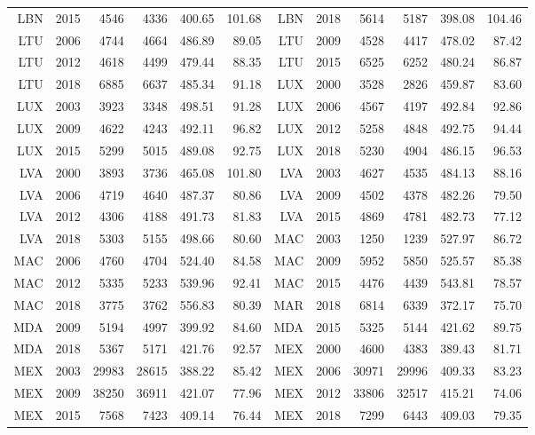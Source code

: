 {\begin{longtable}{r|r|r|r|r|r||r|r|r|r|r|r}
    LBN   & 2015  & 4546  & 4336  & 400.65 & 101.68 & LBN   & 2018  & 5614  & 5187  & 398.08 & 104.46 \\
    LTU   & 2006  & 4744  & 4664  & 486.89 & 89.05 & LTU   & 2009  & 4528  & 4417  & 478.02 & 87.42 \\
    LTU   & 2012  & 4618  & 4499  & 479.44 & 88.35 & LTU   & 2015  & 6525  & 6252  & 480.24 & 86.87 \\
    LTU   & 2018  & 6885  & 6637  & 485.34 & 91.18 & LUX   & 2000  & 3528  & 2826  & 459.87 & 83.60 \\
    LUX   & 2003  & 3923  & 3348  & 498.51 & 91.28 & LUX   & 2006  & 4567  & 4197  & 492.84 & 92.86 \\
    LUX   & 2009  & 4622  & 4243  & 492.11 & 96.82 & LUX   & 2012  & 5258  & 4848  & 492.75 & 94.44 \\
    LUX   & 2015  & 5299  & 5015  & 489.08 & 92.75 & LUX   & 2018  & 5230  & 4904  & 486.15 & 96.53 \\
    LVA   & 2000  & 3893  & 3736  & 465.08 & 101.80 & LVA   & 2003  & 4627  & 4535  & 484.13 & 88.16 \\
    LVA   & 2006  & 4719  & 4640  & 487.37 & 80.86 & LVA   & 2009  & 4502  & 4378  & 482.26 & 79.50 \\
    LVA   & 2012  & 4306  & 4188  & 491.73 & 81.83 & LVA   & 2015  & 4869  & 4781  & 482.73 & 77.12 \\
    LVA   & 2018  & 5303  & 5155  & 498.66 & 80.60 & MAC   & 2003  & 1250  & 1239  & 527.97 & 86.72 \\
    MAC   & 2006  & 4760  & 4704  & 524.40 & 84.58 & MAC   & 2009  & 5952  & 5850  & 525.57 & 85.38 \\
    MAC   & 2012  & 5335  & 5233  & 539.96 & 92.41 & MAC   & 2015  & 4476  & 4439  & 543.81 & 78.57 \\
    MAC   & 2018  & 3775  & 3762  & 556.83 & 80.39 & MAR   & 2018  & 6814  & 6339  & 372.17 & 75.70 \\
    MDA   & 2009  & 5194  & 4997  & 399.92 & 84.60 & MDA   & 2015  & 5325  & 5144  & 421.62 & 89.75 \\
    MDA   & 2018  & 5367  & 5171  & 421.76 & 92.57 & MEX   & 2000  & 4600  & 4383  & 389.43 & 81.71 \\
    MEX   & 2003  & 29983 & 28615 & 388.22 & 85.42 & MEX   & 2006  & 30971 & 29996 & 409.33 & 83.23 \\
    MEX   & 2009  & 38250 & 36911 & 421.07 & 77.96 & MEX   & 2012  & 33806 & 32517 & 415.21 & 74.06 \\
    MEX   & 2015  & 7568  & 7423  & 409.14 & 76.44 & MEX   & 2018  & 7299  & 6443  & 409.03 & 79.35 \\

\end{longtable}}

